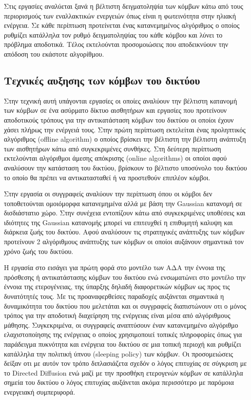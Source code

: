 Στις εργασίες \cite{harvesting_8} \cite{harvesting_9} αναλύεται ξανά η βέλτιστη δειγματοληψία των κόμβων κάτω από τους περιορισμούς των εναλλακτικών ενεργειών όπως
είναι η φωτεινότητα στην ηλιακή ενέργεια. Σε κάθε περίπτωση προτείνεται ένας κατανεμημένος αλγόριθμος ο οποίος ρυθμίζει κατάλληλα τον ρυθμό δειγματοληψίας του κάθε
κόμβου και λύνει το πρόβλημα αποδοτικά. Τέλος εκτελούνται προσομοιώσεις που αποδεικνύουν την απόδοση του εκάστοτε αλγορίθμου.



\subsection{Τεχνικές αυξησης των κόμβων του δικτύου}
Στην τεχνική αυτή υπάγονται εργασίες οι οποίες αναλύουν την βέλτιστη κατανομή των κόμβων σε ένα ασύρματο δίκτυο αισθητήρων και εργασίες που προτείνουν αποδοτικούς
τρόπους για την αντικατάσταση κόμβων του δικτύου οι οποίοι έχουν χάσει πλήρως την ενέργειά τους. Στην πρώτη περίπτωση εκτελείται ένας προληπτικός αλγόριθμος (offline
algorithm) ο οποίος βρίσκει την βέλτιστη την βέλτιστη ανάπτυξη των αισθητήρων κάτω από συγκεκριμένες συνθήκες. Στη δεύτερη περίπτωση εκτελούνται αλγόριθμοι άμεσης
απόκρισης (online algorithms) οι οποίοι αφού αναλύσουν την κατάσταση του δικτύου, βρίσκουν το βέλτιστο υποσύνολο του δικτύου το οποίο θα πρέπει να αντικατασταθεί ή
να προστεθούν επιπλέον κόμβοι.

Στην εργασία \cite{gaussian_sensors} οι συγγραφείς αναλύουν την περίπτωση όπου οι κόμβοι δεν τοποθετούνται ομοιόμορφα κατανεμημένα αλλά με βάση την Gaussian κατανομή
σε δισδιάστατιο χώρο. Στην συνέχεια εντοπίζουν κάτω από συγκεκριμένες υποθέσεις και ιδιότητες της Gaussian κατανομής μπορεί να επιτευχθεί η επιθυμητή καλυψη και
διάρκεια ζωής του δικτύου. Αφού αναλύσουν τις στρατηγικές ανάπτυξης των κόμβων προτείνουν 2 αλγόριθμους ανάπτυξης των κόμβων οι οποίοι αυξάνουν σημαντικά τον χρόνο
ζωής του δικτύου.

Η εργασία στο \cite{sens_deployment3} εισάγει για πρώτη φορά στο μοντέλο των ΑΔΑ την έννοια της πρόσθεσης ή αντικατάστασης κόμβων του δικτύου ενώ ενσωματώνει στο
μοντέλο την έννοια της ετερογένειας, της ύπαρξης δηλαδή διαφορετικών κόμβων ως προς τις δυνατότητές τους. Με τις προαναφερθείσες παραδοχές αυξάνεται σημαντικά η
δυναμικότητα του δικτύου που μελετάται και οι συγγραφείς διαπιστώνουν οτι ο μόνος τρόπος για την αποδοτική διαχείρηση της ενέργειας είναι μέσα από αλγόριθμους
μάθησης. Συγκεκριμένα, οι συγγραφείς αναπτύσουν έναν κατανεμημένο αλγόριθμο ελαχιστοποίησης της ενέργειας ο οποίος χρησιμοποιεί τοπικές πληροφορίες όπως για
παράδειγμα πυκνότητα και ενέργεια του δικτύου σε μια τοπική περιοχή και ρυθμίζει κατάλληλα την πολιτική ύπνου (sleeping policy) των κόμβων. Οι προσομειώσεις δείξαν
οτι με αυτόν τον τρόπο διπλασιάζετα σχεδόν ο λόγος επιτυχίας σε σύγκριση με το Directed Diffusion ενώ μαζί με την προσθήκη ετερογενών κόμβων σε κατάλληλα σημεία του
δικτύου ο λόγος επιτυχίας αυξάνεται ακόμα περισσότερο με παρόμοια ενεργειακή συμπεριφορά.

